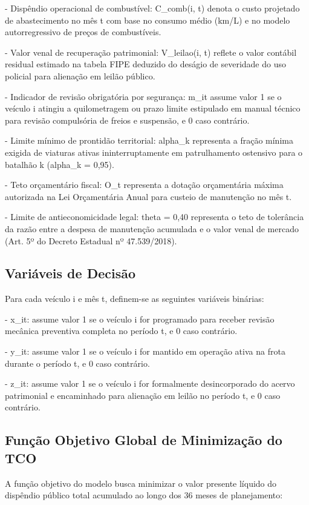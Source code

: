 \documentclass[12pt,a4paper]{article}
\begin{document}
- Dispêndio operacional de combustível: C\_comb(i, t) denota o custo projetado de abastecimento no mês t com base no consumo médio (km/L) e no modelo autorregressivo de preços de combustíveis.

- Valor venal de recuperação patrimonial: V\_leilao(i, t) reflete o valor contábil residual estimado na tabela FIPE deduzido do deságio de severidade do uso policial para alienação em leilão público.

- Indicador de revisão obrigatória por segurança: m\_it assume valor 1 se o veículo i atingiu a quilometragem ou prazo limite estipulado em manual técnico para revisão compulsória de freios e suspensão, e 0 caso contrário.

- Limite mínimo de prontidão territorial: alpha\_k representa a fração mínima exigida de viaturas ativas ininterruptamente em patrulhamento ostensivo para o batalhão k (alpha\_k = 0,95).

- Teto orçamentário fiscal: O\_t representa a dotação orçamentária máxima autorizada na Lei Orçamentária Anual para custeio de manutenção no mês t.

- Limite de antieconomicidade legal: theta = 0,40 representa o teto de tolerância da razão entre a despesa de manutenção acumulada e o valor venal de mercado (Art. 5º do Decreto Estadual nº 47.539/2018).


\subsection{Variáveis de Decisão}

Para cada veículo i e mês t, definem-se as seguintes variáveis binárias:

- x\_it: assume valor 1 se o veículo i for programado para receber revisão mecânica preventiva completa no período t, e 0 caso contrário.

- y\_it: assume valor 1 se o veículo i for mantido em operação ativa na frota durante o período t, e 0 caso contrário.

- z\_it: assume valor 1 se o veículo i for formalmente desincorporado do acervo patrimonial e encaminhado para alienação em leilão no período t, e 0 caso contrário.


\subsection{Função Objetivo Global de Minimização do TCO}

A função objetivo do modelo busca minimizar o valor presente líquido do dispêndio público total acumulado ao longo dos 36 meses de planejamento:
\end{document}
